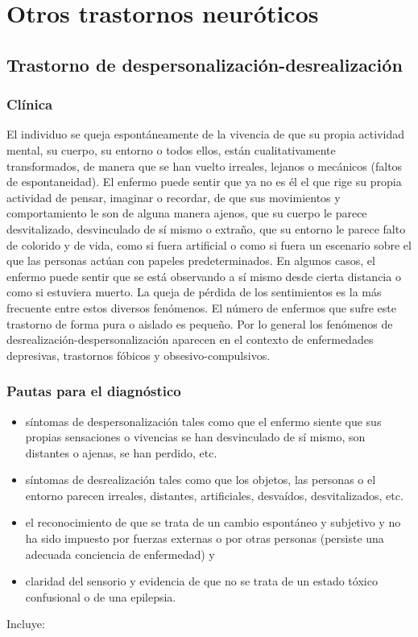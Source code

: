 \chapter{Otros trastornos neuróticos}
\section*{Trastorno de despersonalización-desrealización}
\subsection*{Clínica}
El individuo se queja espontáneamente de la vivencia de que su propia actividad mental, su cuerpo, su entorno o todos ellos, están cualitativamente transformados, de manera que se han vuelto irreales, lejanos o mecánicos (faltos de espontaneidad). El enfermo puede sentir que ya no es él el que rige su propia actividad de pensar, imaginar o recordar, de que sus movimientos y comportamiento le son de alguna manera ajenos, que su cuerpo le parece desvitalizado, desvinculado de sí mismo o extraño, que su entorno le parece falto de colorido y de vida, como si fuera artificial o como si fuera un escenario sobre el que las personas actúan con papeles predeterminados. En algunos casos, el enfermo puede sentir que se está observando a sí mismo desde cierta distancia o como si estuviera muerto. La queja de pérdida de los sentimientos es la más frecuente entre estos diversos fenómenos. El número de enfermos que sufre este trastorno de forma pura o aislado es pequeño. Por lo general los fenómenos de desrealización-despersonalización aparecen en el contexto de enfermedades depresivas, trastornos fóbicos y obsesivo-compulsivos. 
\subsection*{Pautas para el diagnóstico}
\begin{itemize}
    \item síntomas de despersonalización tales como que el enfermo siente que sus propias sensaciones o vivencias se han desvinculado de sí mismo, son distantes o ajenas, se han perdido, etc.
    \item síntomas de desrealización tales como que los objetos, las personas o el entorno parecen irreales, distantes, artificiales, desvaídos, desvitalizados, etc.
    \item el reconocimiento de que se trata de un cambio espontáneo y subjetivo y no ha sido impuesto por fuerzas externas o por otras personas (persiste una adecuada conciencia de enfermedad) y
    \item claridad del sensorio y evidencia de que no se trata de un estado tóxico confusional o de una epilepsia.
\end{itemize}
Incluye:

